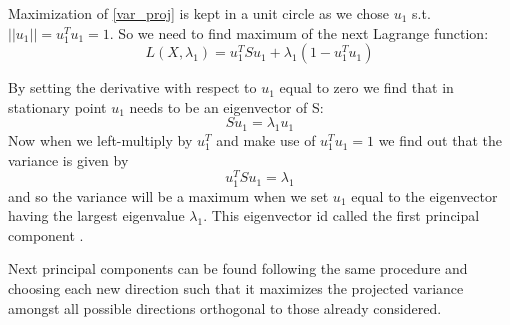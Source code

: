 Maximization of \eqref{var_proj} is kept in a unit circle as we chose $u_1$ s.t. $||u_1||=u_1^T u_1=1$. So we need to find maximum of the next Lagrange function:
\begin{equation}
L(X,\lambda_1) = u_1^T S u_1 + \lambda_1(1-u_1^T u_1)
\end{equation}

By setting the derivative with respect to $u_1$ equal to zero we find that in stationary point $u_1$ needs to be an eigenvector of S:
\begin{equation}
S u_1 = \lambda_1 u_1
\end{equation}
Now when we left-multiply by $u^T_1$ and make use of $u^T_1 u_1 = 1$ we find out that the variance is given by
\begin{equation}
u_1^T S u_1 = \lambda_1 
\end{equation}
and so the variance will be a maximum when we set $u_1$ equal to the eigenvector
having the largest eigenvalue $\lambda_1$. This eigenvector id called the first principal
component \citep*{bishop}.

Next principal components can be found following the same procedure and choosing each new direction such that it maximizes the projected variance amongst all possible directions orthogonal to those already considered.


